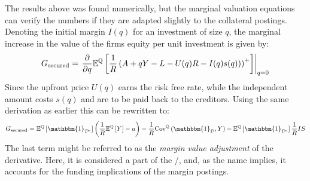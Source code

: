 \documentclass[../main.tex]{subfiles}
\begin{document}
        The results above was found numerically, 
        but the marginal valuation equations can verify the numbers 
        if they are adapted slightly to the collateral postings.
        Denoting the initial margin $I(q)$ for an investment of size $q$,
        the marginal increase in the value of the firms equity per unit investment is given by:
            \begin{equation*}
                G_{\text{secured}} = 
                    \left.
                    \frac{
                        \partial 
                    }{
                        \partial 
                        q
                    }
                    \mathbb{E}^{\mathbb{Q}}\left[
                        \frac{1}{R} 
                        \left(
                            A + qY - L - U(q)R - I(q) s(q))
                        \right)^{+}
                    \right] 
                    \right\rvert_{q=0} 
                    \nonumber
            \end{equation*}
        Since the upfront price $U(q)$ earns the risk free rate,
        while the independent amount costs $s(q)$ and are to be paid back to the creditors.
        Using the same derivation as earlier this can be rewritten to:
            \begin{equation}
                G_{\text{secured}} 
                =
                    \mathbb{E}^{\mathbb{Q}}\left[\mathbbm{1}_{\mathcal{D}^{c}}\right] 
                    \left(
                        \discountfactor
                        \mathbb{E}^{\mathbb{Q}}\left[Y\right] 
                        - u
                    \right)
                    -
                    \discountfactor
                    \text{Cov}^{\mathbb{Q}}\left(\mathbbm{1}_{\mathcal{D}}, Y\right) 
                    - 
                    \mathbb{E}^{\mathbb{Q}}\left[
                        \mathbbm{1}_{\mathcal{D}^{c}}
                    \right] \discountfactor I S
                \label{eqn:marginal-shareholder-value-debt-financing-collateral}
            \end{equation}
        The last term might be referred to as the \textit{margin value adjustment} of the derivative.
        Here, it is considered a part of the \FVA/, and, 
        as the name implies, it accounts for the funding implications of the margin postings.
\end{document}
